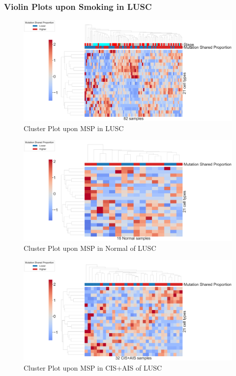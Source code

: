 \documentclass{beamer}
\begin{document}
    \begin{frame}[allowframebreaks]
        \frametitle{Violin Plots upon Smoking in LUSC}

        \begin{figure}
            \includegraphics[width=0.9 \linewidth]{figures/BisqueRNA/clustermap/STAR.FPKM.GSE162498.SQC.MSP-median/Mutation Shared Proportion-All.pdf}
            \caption{Cluster Plot upon MSP in LUSC}
        \end{figure}

        \begin{figure}
            \includegraphics[width=0.9 \linewidth]{figures/BisqueRNA/clustermap/STAR.FPKM.GSE162498.SQC.MSP-median/Mutation Shared Proportion-Normal.pdf}
            \caption{Cluster Plot upon MSP in Normal of LUSC}
        \end{figure}

        \begin{figure}
            \includegraphics[width=0.9 \linewidth]{figures/BisqueRNA/clustermap/STAR.FPKM.GSE162498.SQC.MSP-median/Mutation Shared Proportion-CIS+AIS.pdf}
            \caption{Cluster Plot upon MSP in CIS+AIS of LUSC}
        \end{figure}


\end{frame}
\end{document}
